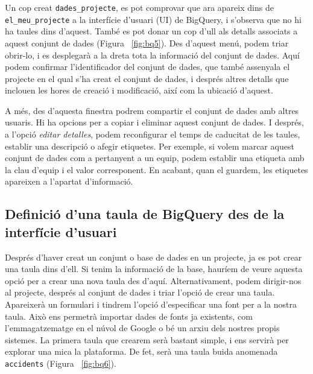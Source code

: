 \documentclass[12pt,longbibliography]{article}
\theoremstyle{definition}
\theoremstyle{remark}
\begin{document}
Un cop creat \verb|dades_projecte|, es pot comprovar que ara apareix dins de \verb|el_meu_projecte| a la interfície d'usuari (UI) de BigQuery, i s'observa que no hi ha taules dins d'aquest. També es pot donar un cop d'ull als detalls associats a aquest conjunt de dades (Figura ~\ref{fig:bq5}). Des d'aquest menú, podem triar obrir-lo, i es desplegarà a la dreta tota la informació del conjunt de dades. Aquí podem confirmar l'identificador del conjunt de dades, que també assenyala el projecte en el qual s'ha creat el conjunt de dades, i després altres detalls que inclouen les hores de creació i modificació, així com la ubicació d'aquest.



A més, des d'aquesta finestra podrem compartir el conjunt de dades amb altres usuaris. Hi ha opcions per a copiar i eliminar aquest conjunt de dades. I després, a l'opció \textit{editar detalles}, podem reconfigurar el temps de caducitat de les taules, establir una descripció o afegir etiquetes. Per exemple, si volem marcar aquest conjunt de dades com a pertanyent a un equip, podem establir una etiqueta amb la clau d'equip i el valor corresponent. En acabant, quan el guardem, les etiquetes apareixen a l'apartat d'informació.

\subsection{Definició d'una taula de BigQuery des de la interfície d'usuari}

Després d'haver creat un conjunt o base de dades en un projecte, ja es pot crear una taula dins d'ell. Si tenim la informació de la base, hauríem de veure aquesta opció per a crear una nova taula des d'aquí. Alternativament, podem dirigir-nos al projecte, després al conjunt de dades i triar l'opció de crear una taula. Apareixerà un formulari i tindrem l'opció d'especificar una font per a la nostra taula. Això ens permetrà importar dades de fonts ja existents, com l'emmagatzematge en el núvol de Google o bé un arxiu dels nostres propis sistemes. La primera taula que crearem serà bastant simple, i ens servirà per explorar una mica la plataforma. De fet, serà una taula buida anomenada \verb|accidents| (Figura ~\ref{fig:bq6}). 
\end{document}
